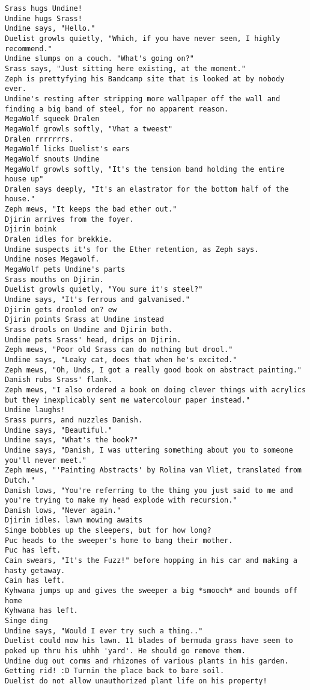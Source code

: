 \begin{verbatim}
Srass hugs Undine!
Undine hugs Srass!
Undine says, "Hello."
Duelist growls quietly, "Which, if you have never seen, I highly recommend."
Undine slumps on a couch. "What's going on?"
Srass says, "Just sitting here existing, at the moment."
Zeph is prettyfying his Bandcamp site that is looked at by nobody ever.
Undine's resting after stripping more wallpaper off the wall and finding a big band of steel, for no apparent reason.
MegaWolf squeek Dralen
MegaWolf growls softly, "Vhat a tweest"
Dralen rrrrrrrs.
MegaWolf licks Duelist's ears
MegaWolf snouts Undine
MegaWolf growls softly, "It's the tension band holding the entire house up"
Dralen says deeply, "It's an elastrator for the bottom half of the house."
Zeph mews, "It keeps the bad ether out."
Djirin arrives from the foyer.
Djirin boink
Dralen idles for brekkie.
Undine suspects it's for the Ether retention, as Zeph says.
Undine noses Megawolf.
MegaWolf pets Undine's parts
Srass mouths on Djirin.
Duelist growls quietly, "You sure it's steel?"
Undine says, "It's ferrous and galvanised."
Djirin gets drooled on? ew
Djirin points Srass at Undine instead
Srass drools on Undine and Djirin both.
Undine pets Srass' head, drips on Djirin.
Zeph mews, "Poor old Srass can do nothing but drool."
Undine says, "Leaky cat, does that when he's excited."
Zeph mews, "Oh, Unds, I got a really good book on abstract painting."
Danish rubs Srass' flank.
Zeph mews, "I also ordered a book on doing clever things with acrylics but they inexplicably sent me watercolour paper instead."
Undine laughs!
Srass purrs, and nuzzles Danish.
Undine says, "Beautiful."
Undine says, "What's the book?"
Undine says, "Danish, I was uttering something about you to someone you'll never meet."
Zeph mews, "'Painting Abstracts' by Rolina van Vliet, translated from Dutch."
Danish lows, "You're referring to the thing you just said to me and you're trying to make my head explode with recursion."
Danish lows, "Never again."
Djirin idles. lawn mowing awaits
Singe bobbles up the sleepers, but for how long?
Puc heads to the sweeper's home to bang their mother.
Puc has left.
Cain swears, "It's the Fuzz!" before hopping in his car and making a hasty getaway.
Cain has left.
Kyhwana jumps up and gives the sweeper a big *smooch* and bounds off home
Kyhwana has left.
Singe ding
Undine says, "Would I ever try such a thing.."
Duelist could mow his lawn. 11 blades of bermuda grass have seem to poked up thru his uhhh 'yard'. He should go remove them.
Undine dug out corms and rhizomes of various plants in his garden. Getting rid! :D Turnin the place back to bare soil.
Duelist do not allow unauthorized plant life on his property!

\end{verbatim}
